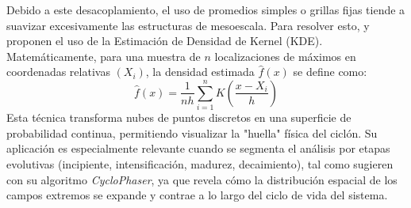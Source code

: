 Debido a este desacoplamiento, el uso de promedios simples o grillas fijas tiende a suavizar excesivamente las estructuras de mesoescala. Para resolver esto, \citet{priestley2022improved} y \citet{han2025system} proponen el uso de la Estimación de Densidad de Kernel (KDE). Matemáticamente, para una muestra de $n$ localizaciones de máximos en coordenadas relativas $(X_i)$, la densidad estimada $\hat{f}(x)$ se define como:
\begin{equation}
    \hat{f}(x) = \frac{1}{nh} \sum_{i=1}^{n} K\left(\frac{x - X_i}{h}\right)
\end{equation}
Esta técnica transforma nubes de puntos discretos en una superficie de probabilidad continua, permitiendo visualizar la "huella" física del ciclón. Su aplicación es especialmente relevante cuando se segmenta el análisis por etapas evolutivas (incipiente, intensificación, madurez, decaimiento), tal como sugieren \citet{coutodesouza2024new} con su algoritmo \textit{CycloPhaser}, ya que revela cómo la distribución espacial de los campos extremos se expande y contrae a lo largo del ciclo de vida del sistema.